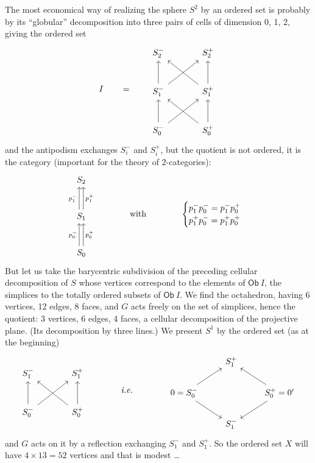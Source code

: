 \documentclass[11pt]{article}
\newcommand{\msp}[1]{\marginpar{\footnotesize [#1]}}
\begin{document}
The most economical way of realizing the sphere $S^2$ by an ordered set is probably by its ``globular'' decomposition into three pairs of cells of dimension 0, 1, 2, giving the ordered set
\[
I \qquad = \qquad
\begin{tikzcd}[row sep=large, column sep=large]
S_2^- & S_2^+ \\
S_1^- \arrow[u] \arrow[ur] & S_1^+ \arrow[u] \arrow[ul] \\
S_0^- \arrow[u] \arrow[ur] & S_0^+ \arrow[u] \arrow[ul]
\end{tikzcd}
\]
and the antipodism exchanges $S_i^-$ and $S_i^+$, but the quotient is not ordered, it is the category (important for the theory of 2-categories):
\msp{page 95}
\[
\begin{tikzcd}[row sep=large]
S_2 \\
S_1 \arrow[u, shift left, "p_1^-"] \arrow[u, shift right, "p_1^+"'] \\
S_0 \arrow[u, shift left, "p_0^-"] \arrow[u, shift right, "p_0^+"']
\end{tikzcd}
\qquad\qquad \text{with} \qquad\qquad
\begin{cases}
p_1^- p_0^- = p_1^- p_0^+ \\
p_1^+ p_0^- = p_1^+ p_0^+
\end{cases}
\]
But let us take the barycentric subdivision of the preceding cellular decomposition of $S$ whose vertices correspond to the elements of $\mathsf{Ob}\ I$, the simplices to the totally ordered subsets of $\mathsf{Ob}\ I$. We find the octahedron, having 6 vertices, 12 edges, 8 faces, and $G$ acts freely on the set of simplices, hence the quotient: 3 vertices, 6 edges, 4 faces, a cellular decomposition of the projective plane. (Its decomposition by three lines.) We present $S^1$ by the ordered set (as at the beginning) %
\[
\begin{tikzcd}[row sep=large, column sep=large]
S_1^- & S_1^+ \\
S_0^- \arrow[u] \arrow[ur] & S_0^+ \arrow[u] \arrow[ul]
\end{tikzcd}
\qquad\qquad \textit{i.e.} \qquad\qquad
\begin{tikzcd}
 & S_1^+ & \\
0 = S_0^- \arrow[ur] \arrow[dr] & & S_0^+ = 0' \arrow[ul] \arrow[dl] \\
 & S_1^- &
\end{tikzcd}
\]
and $G$ acts on it by a reflection exchanging $S_1^-$ and $S_1^+$. So the ordered set $X$ will have $4 \times 13 = 52$ vertices and that is modest \ldots
\end{document}
